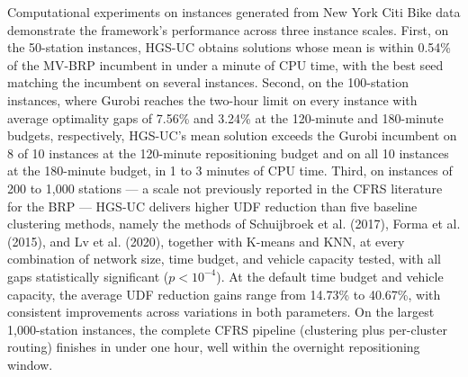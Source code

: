 \documentclass[11pt]{article}
\numberwithin{table}{section}
\numberwithin{figure}{section}
\begin{document}
Computational experiments on instances generated from New York Citi Bike data demonstrate the framework's performance across three instance scales. First, on the 50-station instances, HGS-UC obtains solutions whose mean is within 0.54\% of the MV-BRP incumbent in under a minute of CPU time, with the best seed matching the incumbent on several instances. Second, on the 100-station instances, where Gurobi reaches the two-hour limit on every instance with average optimality gaps of 7.56\% and 3.24\% at the 120-minute and 180-minute budgets, respectively,  HGS-UC's mean solution exceeds the Gurobi incumbent on 8 of 10 instances at the 120-minute repositioning budget and on all 10 instances at the 180-minute budget, in 1 to 3 minutes of CPU time. Third, on instances of 200 to 1,000 stations — a scale not previously reported in the CFRS literature for the BRP — HGS-UC delivers higher UDF reduction than five baseline clustering methods, namely the methods of Schuijbroek et al. (2017), Forma et al. (2015), and Lv et al. (2020), together with K-means and KNN, at every combination of network size, time budget, and vehicle capacity tested, with all gaps statistically significant ($p<10^{-4}$). At the default time budget and vehicle capacity, the average UDF reduction gains range from 14.73\% to 40.67\%, with consistent improvements across variations in both parameters. On the largest 1,000-station instances, the complete CFRS pipeline (clustering plus per-cluster routing) finishes in under one hour, well within the overnight repositioning window.
\end{document}
